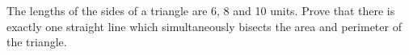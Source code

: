 The lengths of the sides of a triangle are 6, 8 and 10 units.  Prove that there is exactly one straight line which simultaneously bisects the area and perimeter of the triangle.